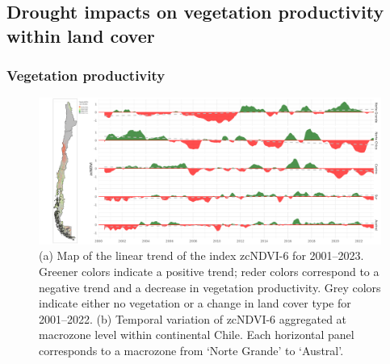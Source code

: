 \documentclass[
  authoryear,
  preprint,
  3p,
  onecolumn]{elsarticle}
\begin{document}
\hypertarget{drought-impacts-on-vegetation-productivity-within-land-cover-1}{%
\subsection{Drought impacts on vegetation productivity within land
cover}\label{drought-impacts-on-vegetation-productivity-within-land-cover-1}}

\hypertarget{vegetation-productivity}{%
\subsubsection{Vegetation productivity}\label{vegetation-productivity}}

\begin{figure}[!ht]

{\centering \includegraphics{../output/figs/temporal_variation_zcNDVI6_macrozonas_con_mapa.png}

}

\caption{\label{fig-zcNDVI_var}(a) Map of the linear trend of the index
zcNDVI-6 for 2001--2023. Greener colors indicate a positive trend; reder
colors correspond to a negative trend and a decrease in vegetation
productivity. Grey colors indicate either no vegetation or a change in
land cover type for 2001--2022. (b) Temporal variation of zcNDVI-6
aggregated at macrozone level within continental Chile. Each horizontal
panel corresponds to a macrozone from `Norte Grande' to `Austral'.}

\end{figure}
\end{document}
